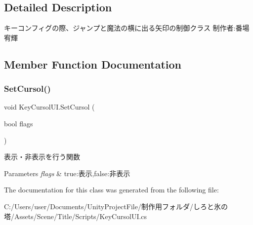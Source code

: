 \subsection{Detailed Description}
キーコンフィグの際、ジャンプと魔法の横に出る矢印の制御クラス 制作者\+:番場宥輝 



\subsection{Member Function Documentation}
\mbox{\label{class_key_cursol_u_i_abe6520ce52d158f778b1fc81d88c1ee3}} 
\subsubsection{\texorpdfstring{Set\+Cursol()}{SetCursol()}}
{\footnotesize\ttfamily void Key\+Cursol\+U\+I.\+Set\+Cursol (\begin{DoxyParamCaption}\item[{bool}]{flags }\end{DoxyParamCaption})\hspace{0.3cm}{\ttfamily [inline]}}



表示・非表示を行う関数 


\begin{DoxyParams}{Parameters}
{\em flags} & true\+:表示,false\+:非表示\\
\hline
\end{DoxyParams}


The documentation for this class was generated from the following file\+:\begin{DoxyCompactItemize}
\item 
C\+:/\+Users/user/\+Documents/\+Unity\+Project\+File/制作用フォルダ/しろと氷の塔/\+Assets/\+Scene/\+Title/\+Scripts/Key\+Cursol\+U\+I.\+cs\end{DoxyCompactItemize}
